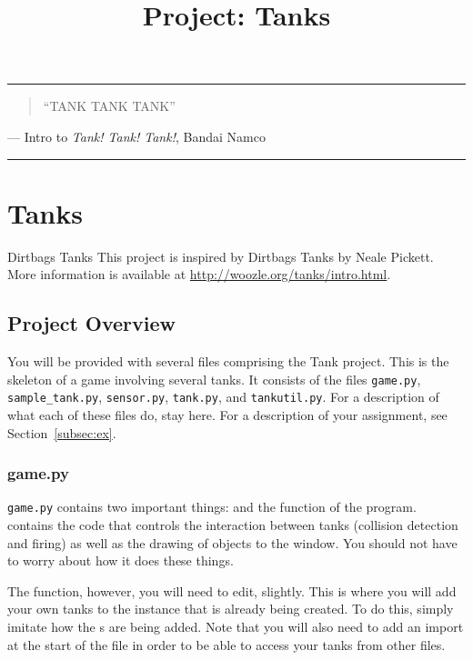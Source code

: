 \documentclass[11pt]{cselabheader}
\title{Project: Tanks}
\begin{document}
\maketitle

\hrule

\begin{quotation}
  ``TANK TANK TANK''
\end{quotation}
\begin{flushright}
  --- Intro to \emph{Tank! Tank! Tank!}, Bandai Namco
\end{flushright}

\hrule


\section{Tanks}

\begin{warningbox}{Dirtbags Tanks}
  This project is inspired by Dirtbags Tanks by Neale Pickett.
  More information is available at \url{http://woozle.org/tanks/intro.html}.
\end{warningbox}

\subsection{Project Overview}
You will be provided with several files comprising the Tank project. This is the
skeleton of a game involving several tanks. It consists of the files
\texttt{game.py}, \texttt{sample\_tank.py}, \texttt{sensor.py},
\texttt{tank.py}, and \texttt{tankutil.py}. For a description of what each of
these files do, stay here. For a description of your assignment, see
Section~\ref{subsec:ex}.

\subsubsection{game.py}
\texttt{game.py} contains two important things:  and
the  function of the program. 
contains the code that controls the interaction between tanks (collision
detection and firing) as well as the drawing of objects to the
 window. You should not have to worry about how it does
these things.

The  function, however, you will need to edit, slightly.
This is where you will add your own tanks to the  instance
that is already being created. To do this, simply imitate how the
s are being added. Note that you will also need to add
an import at the start of the file in order to be able to access your tanks from
other files.
\end{document}
